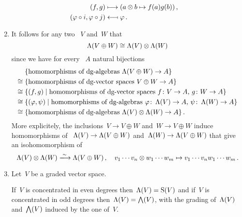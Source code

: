 \begin{enumerate}
\begin{align*}
      \\
      (f, g)
      &\longmapsto
      (a \otimes b \mapsto f(a) g(b)) \,,
      \\
      (\varphi \circ i, \varphi \circ j)
      &\longmapsfrom
      \varphi \,.
    \end{align*}
  \item
    It follows for any two {\dgvs}~$V$ and~$W$ that
    \[
      \operatorname{\Lambda}(V \oplus W)
      \cong
      \operatorname{\Lambda}(V) \otimes \operatorname{\Lambda}(W)
    \]
    since we have for every {\dga}~$A$ natural bijections
    \begin{align*}
      {}&
      \{ \text{homomorphisms of {\dgas}~$\dgSymm(V \oplus W) \to A$} \}
      \\
      \cong{}&
      \{ \text{homomorphisms of {\dgvs}~$V \oplus W \to A$} \}
      \\
      \cong{}&
      \{
        (f,g)
      \suchthat
        \text{homomorphisms of {\dgvs}~$f \colon V \to A$,~$g \colon W \to A$}
      \}
      \\
      \cong{}&
      \{
        (\varphi, \psi)
      \suchthat
        \text{homomorphisms of {\dgas}~$\varphi \colon \dgSymm(V) \to A$,~$\psi \colon \dgSymm(W) \to A$}
      \}
      \\
      \cong{}&
      \{ \text{homomorphisms of {\dgas}~$\dgSymm(V) \tensor \dgSymm(W) \to A$} \} \,.
    \end{align*}
    More explicitely, the inclusions~$V \to V \oplus W$ and~$W \to V \oplus W$ induce homomorphisms of {\dgas}~$\operatorname{\Lambda}(V) \to \operatorname{\Lambda}(V \oplus W)$ and~$\operatorname{\Lambda}(W) \to \operatorname{\Lambda}(V \oplus W)$ that give an isohomomorphism of {\dgas}
    \[
      \dgSymm(V) \tensor \dgSymm(W)
      \xlongto{\sim}
      \dgSymm(V \oplus W) \,,
      \quad
      v_1 \dotsm v_n \tensor w_1 \dotsm w_m
      \mapsto
      v_1 \dotsm v_n w_1 \dotsm w_m \,.
    \]
  \item
    Let~$V$ be a graded vector space.
    
    If~$V$ is concentrated in even degrees then~$\operatorname{\Lambda}(V) = \operatorname{S}(V)$ and if~$V$ is concentrated in odd degrees then~$\operatorname{\Lambda}(V) = \bigwedge(V)$, with the grading of~$\operatorname{\Lambda}(V)$ and~$\bigwedge(V)$ induced by the one of~$V$.
    

\end{enumerate}
